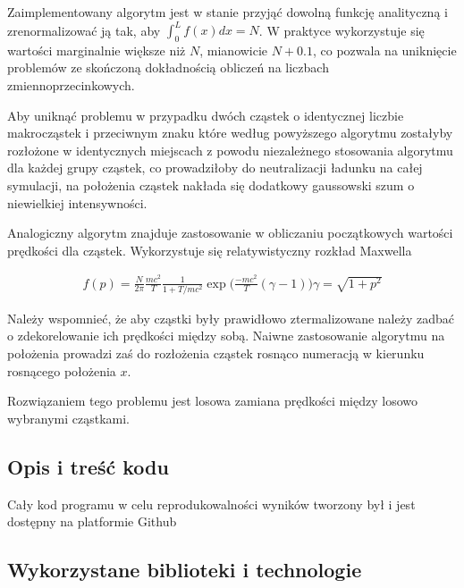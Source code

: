 {    

    Zaimplementowany algorytm jest w stanie przyjąć dowolną funkcję analityczną 
    i zrenormalizować ją tak, aby $\int_0^L f(x) dx = N$. W praktyce wykorzystuje się wartości marginalnie większe
    niż $N$, mianowicie $N+0.1$, co pozwala na uniknięcie problemów ze skończoną dokładnością obliczeń
    na liczbach zmiennoprzecinkowych.

    Aby uniknąć problemu w przypadku dwóch  cząstek o identycznej liczbie makrocząstek i przeciwnym znaku
    które według powyższego algorytmu zostałyby rozłożone w identycznych miejscach z powodu niezależnego
    stosowania algorytmu dla każdej grupy cząstek, co prowadziłoby do neutralizacji ładunku na całej symulacji,
    na położenia cząstek nakłada się dodatkowy gaussowski szum o niewielkiej intensywności.

    Analogiczny algorytm znajduje zastosowanie w obliczaniu początkowych wartości prędkości dla cząstek.
    Wykorzystuje się relatywistyczny rozkład Maxwella

    \begin{align}
        f(p) = \frac{N}{2 \pi} \frac{mc^2}{T} \frac{1}{1+T/mc^2} \exp \Big (\frac{-mc^2}{T}(\gamma -1) \Big)
        \gamma = \sqrt{1+p^2}
        \label{relativistic-maxwell-distribution}
    \end{align}

    Należy wspomnieć, że aby cząstki były prawidłowo ztermalizowane 
    należy zadbać o zdekorelowanie ich prędkości między sobą. Naiwne zastosowanie algorytmu na położenia
    prowadzi zaś do rozłożenia cząstek rosnąco numeracją w kierunku rosnącego położenia $x$.

    Rozwiązaniem tego problemu jest losowa zamiana prędkości między losowo wybranymi cząstkami.

    \subsection{Opis i treść kodu}
    Cały kod programu w celu reprodukowalności wyników tworzony był i jest dostępny na platformie Github 

    \subsection{Wykorzystane biblioteki i technologie}

}
